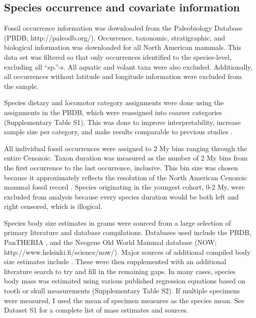 \documentclass{pnastwo}
\begin{document}
\begin{article}
\begin{materials}
\section{Species occurrence and covariate information}
Fossil occurrence information was downloaded from the Paleobiology Database (PBDB; http://paleodb.org/). Occurrence, taxonomic, stratigraphic, and biological information was downloaded for all North American mammals. This data set was filtered so that only occurrences identified to the species-level, excluding all ``sp.''-s. All aquatic and volant taxa were also excluded. Additionally, all occurrences without latitude and longitude information were excluded from the sample.

Species dietary and locomotor category assignments were done using the assignments in the PBDB, which were reassigned into coarser categories (Supplementary Table S1). This was done to improve interpretability, increase sample size per category, and make results comparable to previous studies \cite{Jernvall2004,Price2012}.

All individual fossil occurrences were assigned to 2 My bins ranging through the entire Cenozoic. Taxon duration was measured as the number of 2 My bins from the first occurrence to the last occurrence, inclusive. This bin size was chosen because it approximately reflects the resolution of the North American Cenozoic mammal fossil record \cite{Alroy2009,Alroy2000g,Marcot2014}. Species originating in the youngest cohort, 0-2 My, were excluded from analysis because every species duration would be both left and right censored, which is illogical.

Species body size estimates in grams were sourced from a large selection of primary literature and database compilations. Databases used include the PBDB, PanTHERIA \cite{Jones2009c}, and the Neogene Old World Mammal database (NOW; http://www.helsinki.fi/science/now/). Major sources of additional compiled body size estimates include \cite{Tomiya2013,Brook2004a,Freudenthal2013,McKenna2011,Raia2012f,Smith2004c}. These were then supplemented with an additional literature search to try and fill in the remaining gaps. In many cases, species body mass was estimated using various published regression equations based on tooth or skull measurements (Supplementary Table S2). If multiple specimens were measured, I used the mean of specimen measures as the species mean. See Dataset S1 for a complete list of mass estimates and sources.


\end{materials}
\end{article}
\end{document}
